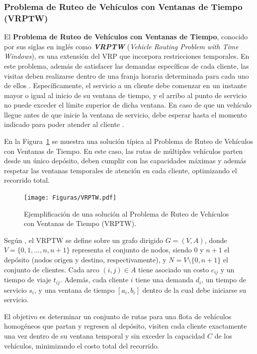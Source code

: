 \documentclass[12pt,titlepage,twoside,openright]{book}
\begin{document}
\subsubsection{Problema de Ruteo de Vehículos con Ventanas de Tiempo (VRPTW)}
\label{subsec:problem_vrptw}

El \textbf{Problema de Ruteo de Vehículos con Ventanas de Tiempo}, conocido por sus siglas en inglés como \textbf{\textit{VRPTW}} (\textit{Vehicle Routing Problem with Time Windows}), es una extensión del VRP que incorpora restricciones temporales. En este problema, además de satisfacer las demandas específicas de cada cliente, las visitas deben realizarse dentro de una franja horaria determinada para cada uno de ellos \citep{toth2014}. Específicamente, el servicio a un cliente debe comenzar en un instante mayor o igual al inicio de su ventana de tiempo, y el arribo al punto de servicio no puede exceder el límite superior de dicha ventana. En caso de que un vehículo llegue antes de que inicie la ventana de servicio, debe esperar hasta el momento indicado para poder atender al cliente \citep{montes2017}.

En la Figura~\ref{fig:vrptw} se muestra una solución típica al Problema de Ruteo de Vehículos con Ventanas de Tiempo. En este caso, las rutas de múltiples vehículos parten desde un único depósito, deben cumplir con las capacidades máximas y además respetar las ventanas temporales de atención en cada cliente, optimizando el recorrido total.

\begin{figure}[H]
	\centering
	\texttt{[image: Figuras/VRPTW.pdf]}
	\caption{Ejemplificación de una solución al Problema de Ruteo de Vehículos con Ventanas de Tiempo (VRPTW).}
	\label{fig:vrptw}
\end{figure}

Según \citep{toth2014}, el VRPTW se define sobre un grafo dirigido \(G = (V, A)\), donde \(V = \{0, 1, \dots, n, n+1\}\) representa el conjunto de nodos, siendo \(0\) y \(n+1\) el depósito (nodos origen y destino, respectivamente), y \(N = V \setminus \{0, n+1\}\) el conjunto de clientes. Cada arco \((i, j) \in A\) tiene asociado un costo \(c_{ij}\) y un tiempo de viaje \(t_{ij}\). Además, cada cliente \(i\) tiene una demanda \(d_i\), un tiempo de servicio \(s_i\), y una ventana de tiempo \([a_i, b_i]\) dentro de la cual debe iniciarse su servicio.

El objetivo es determinar un conjunto de rutas para una flota de vehículos homogéneos que partan y regresen al depósito, visiten cada cliente exactamente una vez dentro de su ventana temporal y sin exceder la capacidad \(C\) de los vehículos, minimizando el costo total del recorrido.
\end{document}
